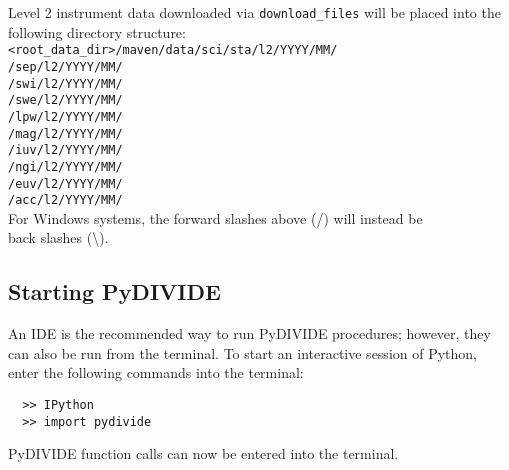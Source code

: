\documentclass{article}
\begin{document}
\noindent Level 2 instrument data downloaded via \texttt{download\_files} will be placed into the following directory structure:\\
\texttt{<root\_data\_dir>/maven/data/sci/sta/l2/YYYY/MM/}\\
\texttt{\indent \indent \indent \indent \indent \indent \indent \indent \indent \indent \enskip /sep/l2/YYYY/MM/}\\
\texttt{\indent \indent \indent \indent \indent \indent \indent \indent \indent \indent \enskip /swi/l2/YYYY/MM/}\\
\texttt{\indent \indent \indent \indent \indent \indent \indent \indent \indent \indent \enskip /swe/l2/YYYY/MM/}\\
\texttt{\indent \indent \indent \indent \indent \indent \indent \indent \indent \indent \enskip /lpw/l2/YYYY/MM/}\\
\texttt{\indent \indent \indent \indent \indent \indent \indent \indent \indent \indent \enskip /mag/l2/YYYY/MM/}\\
\texttt{\indent \indent \indent \indent \indent \indent \indent \indent \indent \indent \enskip /iuv/l2/YYYY/MM/}\\
\texttt{\indent \indent \indent \indent \indent \indent \indent \indent \indent \indent \enskip /ngi/l2/YYYY/MM/}\\
\texttt{\indent \indent \indent \indent \indent \indent \indent \indent \indent \indent \enskip /euv/l2/YYYY/MM/}\\
\texttt{\indent \indent \indent \indent \indent \indent \indent \indent \indent \indent \enskip /acc/l2/YYYY/MM/}\\

 For Windows systems, the forward slashes above (/) will instead be\\
\indent back slashes (\textbackslash).

\subsection{Starting PyDIVIDE}
An IDE is the recommended way to run PyDIVIDE procedures; however, they can also be run from the terminal. To start an interactive session of Python, enter the following commands into the terminal:
\vspace{-5mm}
\begin{verbatim}
  >> IPython
  >> import pydivide
\end{verbatim}
PyDIVIDE function calls can now be entered into the terminal.
\end{document}
